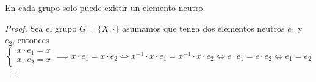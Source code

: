 \begin{thm}
    En cada grupo solo puede existir un elemento neutro.
    \label{thm:neutro}
\end{thm}

\begin{proof}
    Sea el grupo $G = \{X, \cdot\}$ asumamos que tenga dos elementos neutros $e_1$ y $e_2$, entonces
    \begin{equation}
        \begin{cases}
            x \cdot e_{1} = x\\
            x \cdot e_{2} = x
        \end{cases} \implies x \cdot e_{1} = x \cdot e_{2} \iff x^{-1} \cdot x \cdot e_{1} = x^{-1} \cdot x \cdot e_{2} \iff e \cdot e_{1} = e \cdot e_{2} \iff e_{1} = e_{2}  
    \end{equation}
\end{proof}
